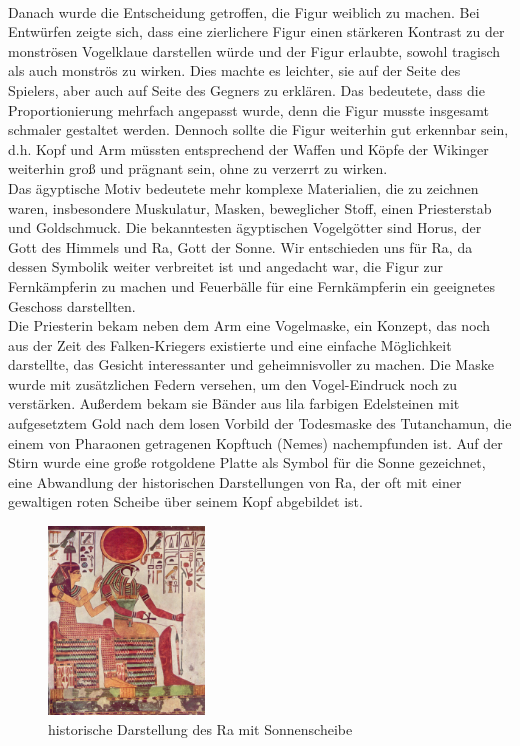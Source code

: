 \documentclass[extern,palatino]{cgBA}
\begin{document}
\\Danach wurde die Entscheidung getroffen, die Figur weiblich zu machen. Bei Entwürfen zeigte sich, dass eine zierlichere Figur einen stärkeren Kontrast zu der monströsen Vogelklaue darstellen würde und der Figur erlaubte, sowohl tragisch als auch monströs zu wirken. Dies machte es leichter, sie auf der Seite des Spielers, aber auch auf Seite des Gegners zu erklären. Das bedeutete, dass die Proportionierung mehrfach angepasst wurde, denn die Figur musste insgesamt schmaler gestaltet werden. Dennoch sollte die Figur weiterhin gut erkennbar sein, d.h. Kopf und Arm müssten entsprechend der Waffen und Köpfe der Wikinger weiterhin groß und prägnant sein, ohne zu verzerrt zu wirken. 
\\Das ägyptische Motiv bedeutete mehr komplexe Materialien, die zu zeichnen waren, insbesondere Muskulatur, Masken, beweglicher Stoff, einen Priesterstab und Goldschmuck. Die bekanntesten ägyptischen Vogelgötter sind Horus, der Gott des Himmels und Ra, Gott der Sonne. Wir entschieden uns für Ra, da dessen Symbolik weiter verbreitet ist und angedacht war, die Figur zur Fernkämpferin zu machen und Feuerbälle für eine Fernkämpferin ein geeignetes Geschoss darstellten.
\\Die Priesterin bekam neben dem Arm eine Vogelmaske, ein Konzept, das noch aus der Zeit des Falken-Kriegers existierte und eine einfache Möglichkeit darstellte, das Gesicht interessanter und geheimnisvoller zu machen. Die Maske wurde mit zusätzlichen Federn versehen, um den Vogel-Eindruck noch zu verstärken. Außerdem bekam sie Bänder aus lila farbigen Edelsteinen mit aufgesetztem Gold nach dem losen Vorbild der Todesmaske des Tutanchamun, die einem von Pharaonen getragenen Kopftuch (Nemes) nachempfunden ist. Auf der Stirn wurde eine große rotgoldene Platte als Symbol für die Sonne gezeichnet, eine Abwandlung der historischen Darstellungen von Ra, der oft mit einer gewaltigen roten Scheibe über seinem Kopf abgebildet ist\cite{ra}.
\begin{figure}[H]
	\centering
	\includegraphics[height=5cm]{ra.jpg}
	\caption{historische Darstellung des Ra mit Sonnenscheibe}
	\label{ra}
\end{figure}
\end{document}

